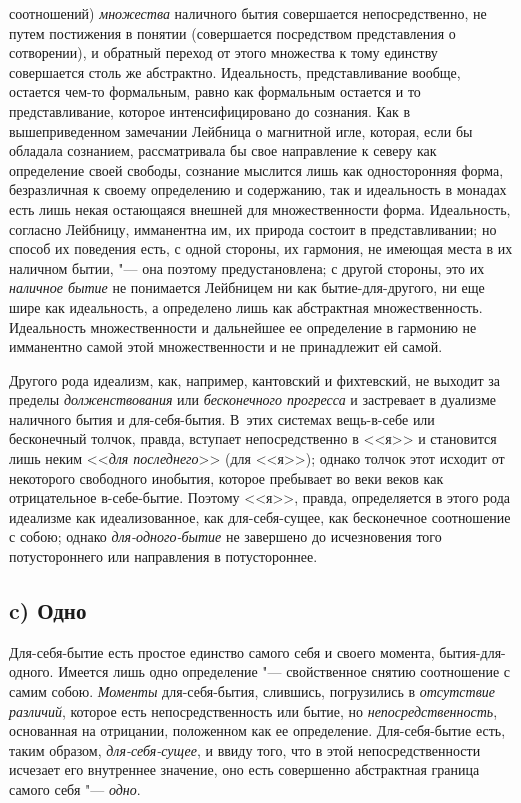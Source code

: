 соотношений) {\em множества} наличного бытия
совершается непосредственно, не путем постижения в понятии (совершается
посредством представления о сотворении), и обратный переход от этого
множества к тому единству совершается столь же абстрактно. Идеальность,
представливание вообще, остается чем-то формальным, равно как формальным
остается и то представливание, которое интенсифицировано до сознания. Как в
вышеприведенном замечании Лейбница о магнитной игле, которая, если
бы обладала сознанием, рассматривала бы свое направление к северу как
определение своей свободы, сознание мыслится лишь как односторонняя форма,
безразличная к своему определению и содержанию, так и идеальность в монадах
есть лишь некая остающаяся внешней для множественности форма. Идеальность,
согласно Лейбницу, имманентна им, их природа состоит в представливании; но
способ их поведения есть, с одной стороны, их гармония, не имеющая места в
их наличном бытии, "--- она поэтому предустановлена; с другой стороны, это их
{\em наличное бытие} не понимается Лейбницем ни как
бытие-для-другого, ни еще шире как идеальность, а определено лишь как
абстрактная множественность. Идеальность множественности и дальнейшее ее
определение в гармонию не имманентно самой этой множественности и не
принадлежит ей самой.

Другого рода идеализм, как, например, кантовский и фихтевский, не выходит за
пределы {\em долженствования} или
{\em бесконечного прогресса} и застревает в дуализме
наличного бытия и для-себя-бытия. В~этих системах вещь-в-себе или
бесконечный толчок, правда, вступает непосредственно в <<я>> и становится
лишь неким <<{\em для последнего}>> (для <<я>>); однако
толчок этот исходит от некоторого свободного инобытия, которое пребывает во
веки веков как отрицательное в-себе-бытие. Поэтому <<я>>, правда,
определяется в этого рода идеализме как идеализованное, как для-себя-сущее,
как бесконечное соотношение с собою; однако
{\em для-одного-бытие} не завершено до исчезновения
того потустороннего или направления в потустороннее.

\subsection[c) Одно]{c) Одно}

Для-себя-бытие есть простое единство самого себя и своего момента,
бытия-для-одного. Имеется лишь одно определение "--- свойственное снятию
соотношение с самим собою. {\em Моменты}
для-себя-бытия, слившись, погрузились в {\em отсутствие
различий}, которое есть непосредственность или бытие, но
{\em непосредственность}, основанная на отрицании,
положенном как ее определение. Для-себя-бытие есть, таким образом,
{\em для-себя-сущее}, и ввиду того, что в этой
непосредственности исчезает его внутреннее значение, оно есть совершенно
абстрактная граница самого себя "--- {\em одно}.

